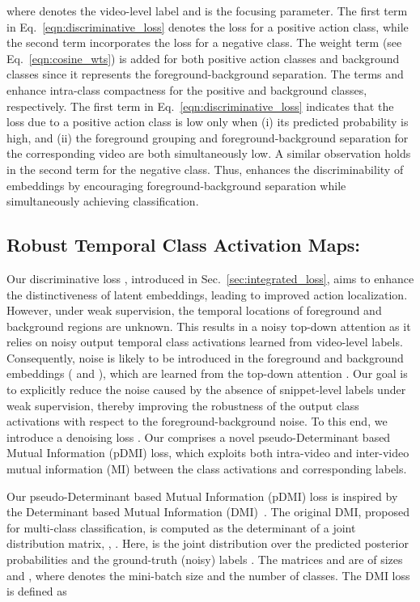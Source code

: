 \documentclass[final]{cvpr}
\begin{document}
where  denotes the video-level label and  is the focusing parameter. The first term in Eq.~\ref{eqn:discriminative_loss} denotes the loss for a positive action class, while the second term incorporates the loss for a negative class. The weight term  (see Eq.~\ref{eqn:cosine_wts}) is added for both positive action classes and background classes since it represents the foreground-background separation. 
The terms  and  enhance intra-class compactness for the positive and background classes, respectively. 
The first term in Eq.~\ref{eqn:discriminative_loss} indicates that the loss due to a positive action class  is low only when (i) its predicted probability  is high, and (ii) the foreground grouping  and foreground-background separation  for the corresponding video are both simultaneously low. A similar observation holds in the second term for the negative class. Thus,  enhances the discriminability of embeddings  by encouraging foreground-background separation while simultaneously achieving classification. 



\subsection{Robust Temporal Class Activation Maps: \label{sec:denoising_loss}}
Our discriminative loss , introduced in Sec.~\ref{sec:integrated_loss}, aims to enhance the distinctiveness of latent embeddings, leading to improved action localization.
However, under weak supervision, the temporal locations of foreground and background regions are unknown. 
This results in a noisy top-down attention as it relies on noisy output temporal class activations learned from video-level labels. 
Consequently, noise is likely to be introduced in the foreground and background embeddings ( and ), which are learned from the top-down attention . 
Our goal is to explicitly reduce the noise caused by the absence of snippet-level labels under weak supervision, thereby improving the robustness of the output class activations with respect to the foreground-background noise. 
To this end, we introduce a denoising loss . Our  comprises a novel pseudo-Determinant based Mutual Information (pDMI) loss, which exploits both intra-video and inter-video mutual information (MI) between the class activations and corresponding labels.





Our pseudo-Determinant based Mutual Information (pDMI) loss is inspired by the Determinant based Mutual Information (DMI)~\cite{dmi_neurips19}. The original DMI, proposed for multi-class classification, is computed as the determinant of a joint distribution matrix, \ie, . Here,  is the joint distribution over the predicted posterior probabilities  and the ground-truth (noisy) labels . The matrices  and  are of sizes  and , where  denotes the mini-batch size and  the number of classes. The DMI loss  is defined as
\end{document}
